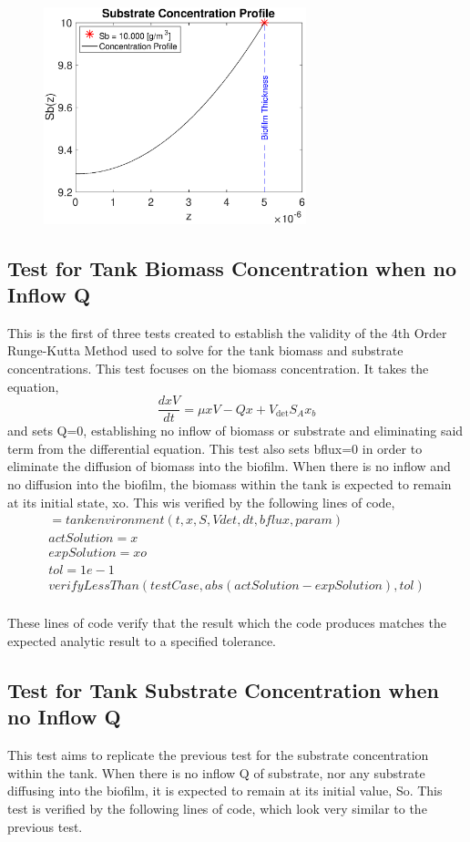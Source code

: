 \documentclass[letterpaper, twoside]{article}
\numberwithin{equation}{section}
\begin{document}
\begin{figure}[H]
  \centering
  \includegraphics[read=eps, width=3in]{BoundaryLayer_Figure1.eps}
\end{figure}

\subsection{Test for Tank Biomass Concentration when no Inflow Q}
This is the first of three tests created to establish the validity of the 4th Order Runge-Kutta Method used to solve for the tank biomass and substrate concentrations. This test focuses on the biomass concentration. It takes the equation,
\begin{equation}
  \frac{dx V}{dt} = \mu xV - Q x +V_{\mathrm{det}} S_A x_b
\end{equation}
and sets Q=0, establishing no inflow of biomass or substrate and eliminating said term from the differential equation. 
This test also sets bflux=0 in order to eliminate the diffusion of biomass into the biofilm. 
When there is no inflow and no diffusion into the biofilm, the biomass within the tank is expected to remain at its initial state, xo. This wis verified by the following lines of code,
\begin{align*}
[~,~,x,~,~]=tankenvironment(t,x,S,Vdet,dt,bflux,param) \\
actSolution=x \\
expSolution=xo \\
tol=1e-1 \\
verifyLessThan(testCase,abs(actSolution-expSolution),tol) \\
\end{align*}

These lines of code verify that the result which the code produces matches the expected analytic result to a specified tolerance.

\subsection{Test for Tank Substrate Concentration when no Inflow Q}
This test aims to replicate the previous test for the substrate concentration within the tank. When there is no inflow Q of substrate, nor any substrate diffusing into the biofilm, it is expected to remain at its initial value, So. This test is verified by the following lines of code, which look very similar to the previous test.
\end{document}

